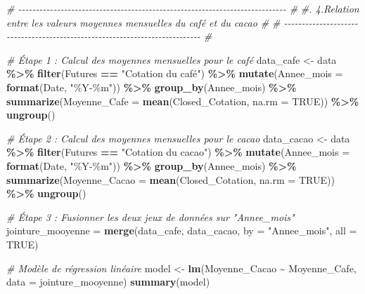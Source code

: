 \documentclass[
]{article}
\newenvironment{Shaded}{\begin{snugshade}}{\end{snugshade}}
\newcommand{\AttributeTok}[1]{\textcolor[rgb]{0.13,0.29,0.53}{#1}}
\newcommand{\CommentTok}[1]{\textcolor[rgb]{0.56,0.35,0.01}{\textit{#1}}}
\newcommand{\ConstantTok}[1]{\textcolor[rgb]{0.56,0.35,0.01}{#1}}
\newcommand{\FunctionTok}[1]{\textcolor[rgb]{0.13,0.29,0.53}{\textbf{#1}}}
\newcommand{\NormalTok}[1]{#1}
\newcommand{\OtherTok}[1]{\textcolor[rgb]{0.56,0.35,0.01}{#1}}
\newcommand{\SpecialCharTok}[1]{\textcolor[rgb]{0.81,0.36,0.00}{\textbf{#1}}}
\newcommand{\StringTok}[1]{\textcolor[rgb]{0.31,0.60,0.02}{#1}}
\begin{document}
\begin{Shaded}
\begin{Highlighting}[]
\CommentTok{\# {-}{-}{-}{-}{-}{-}{-}{-}{-}{-}{-}{-}{-}{-}{-}{-}{-}{-}{-}{-}{-}{-}{-}{-}{-}{-}{-}{-}{-}{-}{-}{-}{-}{-}{-}{-}{-}{-}{-}{-}{-}{-}{-}{-}{-}{-}{-}{-}{-}{-}{-}{-}{-}{-}{-}{-}{-}{-}{-}{-}{-}{-}{-}{-}{-}{-}{-}{-}{-}{-}{-}{-}{-}{-}{-}{-} \#}
\CommentTok{\#.      4.Relation entre les valeurs moyennes mensuelles du café et du cacao  \# }
\CommentTok{\# {-}{-}{-}{-}{-}{-}{-}{-}{-}{-}{-}{-}{-}{-}{-}{-}{-}{-}{-}{-}{-}{-}{-}{-}{-}{-}{-}{-}{-}{-}{-}{-}{-}{-}{-}{-}{-}{-}{-}{-}{-}{-}{-}{-}{-}{-}{-}{-}{-}{-}{-}{-}{-}{-}{-}{-}{-}{-}{-}{-}{-}{-}{-}{-}{-}{-}{-}{-}{-}{-}{-}{-}{-}{-}{-}{-} \#}

\CommentTok{\# Étape 1 : Calcul des moyennes mensuelles pour le café}
\NormalTok{data\_cafe }\OtherTok{\textless{}{-}}\NormalTok{ data }\SpecialCharTok{\%\textgreater{}\%}
  \FunctionTok{filter}\NormalTok{(Futures }\SpecialCharTok{==} \StringTok{"Cotation du café"}\NormalTok{) }\SpecialCharTok{\%\textgreater{}\%}
  \FunctionTok{mutate}\NormalTok{(}\AttributeTok{Annee\_mois =} \FunctionTok{format}\NormalTok{(Date, }\StringTok{"\%Y{-}\%m"}\NormalTok{)) }\SpecialCharTok{\%\textgreater{}\%}
  \FunctionTok{group\_by}\NormalTok{(Annee\_mois) }\SpecialCharTok{\%\textgreater{}\%}
  \FunctionTok{summarize}\NormalTok{(}\AttributeTok{Moyenne\_Cafe =} \FunctionTok{mean}\NormalTok{(Closed\_Cotation, }\AttributeTok{na.rm =} \ConstantTok{TRUE}\NormalTok{)) }\SpecialCharTok{\%\textgreater{}\%}
  \FunctionTok{ungroup}\NormalTok{()}

\CommentTok{\# Étape 2 : Calcul des moyennes mensuelles pour le cacao}
\NormalTok{data\_cacao }\OtherTok{\textless{}{-}}\NormalTok{ data }\SpecialCharTok{\%\textgreater{}\%}
  \FunctionTok{filter}\NormalTok{(Futures }\SpecialCharTok{==} \StringTok{"Cotation du cacao"}\NormalTok{) }\SpecialCharTok{\%\textgreater{}\%}
  \FunctionTok{mutate}\NormalTok{(}\AttributeTok{Annee\_mois =} \FunctionTok{format}\NormalTok{(Date, }\StringTok{"\%Y{-}\%m"}\NormalTok{)) }\SpecialCharTok{\%\textgreater{}\%}
  \FunctionTok{group\_by}\NormalTok{(Annee\_mois) }\SpecialCharTok{\%\textgreater{}\%}
  \FunctionTok{summarize}\NormalTok{(}\AttributeTok{Moyenne\_Cacao =} \FunctionTok{mean}\NormalTok{(Closed\_Cotation, }\AttributeTok{na.rm =} \ConstantTok{TRUE}\NormalTok{)) }\SpecialCharTok{\%\textgreater{}\%}
  \FunctionTok{ungroup}\NormalTok{()}

\CommentTok{\# Étape 3 : Fusionner les deux jeux de données sur "Annee\_mois"}
\NormalTok{jointure\_mooyenne }\OtherTok{=} \FunctionTok{merge}\NormalTok{(data\_cafe, data\_cacao, }\AttributeTok{by =} \StringTok{"Annee\_mois"}\NormalTok{, }\AttributeTok{all =} \ConstantTok{TRUE}\NormalTok{)}

\CommentTok{\# Modèle de régression linéaire}
\NormalTok{model }\OtherTok{\textless{}{-}} \FunctionTok{lm}\NormalTok{(Moyenne\_Cacao }\SpecialCharTok{\textasciitilde{}}\NormalTok{ Moyenne\_Cafe, }\AttributeTok{data =}\NormalTok{ jointure\_mooyenne)}
\FunctionTok{summary}\NormalTok{(model)}
\end{Highlighting}
\end{Shaded}
\end{document}
